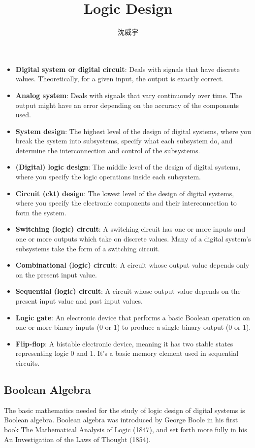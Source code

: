 \documentclass[a4paper,12pt]{article}
\begin{document}
\title{Logic Design}
\author{沈威宇}
\date{\temtoday}
\titletocdoc
{}
\begin{itemize}
\item\textbf{Digital system or digital circuit}: Deals with signals that have discrete values. Theoretically, for a given input, the output is exactly correct.
\item\textbf{Analog system}: Deals with signals that vary continuously over time. The output might have an error depending on the accuracy of the components used.
\item\textbf{System design}: The highest level of the design of digital systems, where you break the system into subsystems, specify what each subsystem do, and determine the interconnection and control of the subsystems.
\item\textbf{(Digital) logic design}: The middle level of the design of digital systems, where you specify the logic operations inside each subsystem.
\item\textbf{Circuit (ckt) design}: The lowest level of the design of digital systems, where you specify the electronic components and their interconnection to form the system.
\item\textbf{Switching (logic) circuit}: A switching circuit has one or more inputs and one or more outputs which take on discrete values. Many of a digital system's subsystems take the form of a switching circuit.
\item\textbf{Combinational (logic) circuit}: A circuit whose output value depends only on the present input value.
\item\textbf{Sequential (logic) circuit}: A circuit whose output value depends on the present input value and past input values.
\item\textbf{Logic gate}: An electronic device that performs a basic Boolean operation on one or more binary inputs (0 or 1) to produce a single binary output (0 or 1).
\item\textbf{Flip-flop}: A bistable electronic device, meaning it has two stable states representing logic 0 and 1. It's a basic memory element used in sequential circuits.
\end{itemize}
\subsection{Boolean Algebra}
The basic mathematics needed for the study of logic design of digital systems is Boolean algebra. Boolean algebra was introduced by George Boole in his first book The Mathematical Analysis of Logic (1847), and set forth more fully in his An Investigation of the Laws of Thought (1854).
\end{document}
